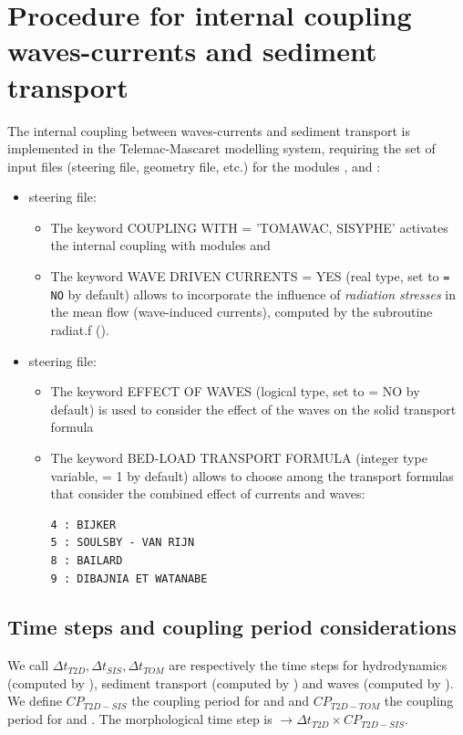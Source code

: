 \section{Procedure for internal coupling waves-currents and sediment transport}
The internal coupling between waves-currents and sediment transport is implemented in the Telemac-Mascaret modelling system, requiring the set of input files (steering file, geometry file, etc.) for the modules , \tomawac{} and \sisyphe{}:
\begin{itemize}
  \item {} steering file:
\begin{itemize}
\item The keyword {\ttfamily COUPLING WITH = 'TOMAWAC, SISYPHE'} activates the internal coupling with modules \tomawac{} and \sisyphe{}
\item The keyword {\ttfamily WAVE DRIVEN CURRENTS = YES} (real type, set to \texttt{= NO} by default) allows to incorporate the influence of \textit{radiation stresses} in the mean flow (wave-induced currents), computed by the subroutine {\ttfamily radiat.f} (\tomawac{}).
\end{itemize}

 \item \sisyphe{} steering file:
\begin{itemize}
\item The keyword {\ttfamily EFFECT OF WAVES} (logical type, set to {\ttfamily = NO} by default) is used to consider the effect of the waves on the solid transport formula
\item The keyword {\ttfamily BED-LOAD TRANSPORT FORMULA} (integer type variable, {\ttfamily = 1} by default) allows to choose among the transport formulas that consider the combined effect of currents and waves:
\begin{lstlisting}[frame=trBL]    
4 : BIJKER 
5 : SOULSBY - VAN RIJN 
8 : BAILARD 
9 : DIBAJNIA ET WATANABE
\end{lstlisting}
\end{itemize}
\end{itemize}

\subsection{Time steps and coupling period considerations}
We call $\Delta t_{T2D}, \Delta t_{SIS}, \Delta t_{TOM}$ are respectively the time steps for hydrodynamics (computed by ), sediment transport (computed by \sisyphe{}) and waves (computed by \tomawac{}). We define $CP_{T2D-SIS}$ the coupling period for  and \sisyphe{} and $CP_{T2D-TOM}$ the coupling period for  and \tomawac{}. The morphological time step is $\rightarrow \Delta t_{T2D} \times CP_{T2D-SIS}$.

